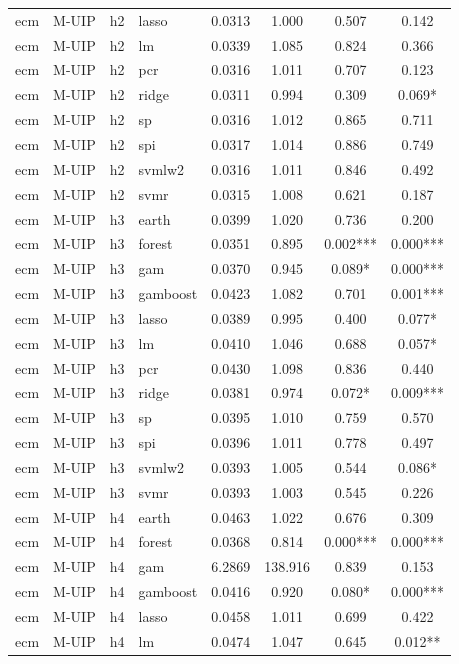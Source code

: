 \begin{ThreePartTable}
\begin{longtable}[t]{llclcccc}
ecm & M-UIP & h2 & lasso & 0.0313 & 1.000 & 0.507 & 0.142\\
ecm & M-UIP & h2 & lm & 0.0339 & 1.085 & 0.824 & 0.366\\
ecm & M-UIP & h2 & pcr & 0.0316 & 1.011 & 0.707 & 0.123\\
ecm & M-UIP & h2 & ridge & 0.0311 & 0.994 & 0.309 & 0.069*\\
ecm & M-UIP & h2 & sp & 0.0316 & 1.012 & 0.865 & 0.711\\
ecm & M-UIP & h2 & spi & 0.0317 & 1.014 & 0.886 & 0.749\\
ecm & M-UIP & h2 & svmlw2 & 0.0316 & 1.011 & 0.846 & 0.492\\
ecm & M-UIP & h2 & svmr & 0.0315 & 1.008 & 0.621 & 0.187\\
\addlinespace
ecm & M-UIP & h3 & earth & 0.0399 & 1.020 & 0.736 & 0.200\\
ecm & M-UIP & h3 & forest & 0.0351 & 0.895 & 0.002*** & 0.000***\\
ecm & M-UIP & h3 & gam & 0.0370 & 0.945 & 0.089* & 0.000***\\
ecm & M-UIP & h3 & gamboost & 0.0423 & 1.082 & 0.701 & 0.001***\\
ecm & M-UIP & h3 & lasso & 0.0389 & 0.995 & 0.400 & 0.077*\\
ecm & M-UIP & h3 & lm & 0.0410 & 1.046 & 0.688 & 0.057*\\
ecm & M-UIP & h3 & pcr & 0.0430 & 1.098 & 0.836 & 0.440\\
ecm & M-UIP & h3 & ridge & 0.0381 & 0.974 & 0.072* & 0.009***\\
ecm & M-UIP & h3 & sp & 0.0395 & 1.010 & 0.759 & 0.570\\
ecm & M-UIP & h3 & spi & 0.0396 & 1.011 & 0.778 & 0.497\\
ecm & M-UIP & h3 & svmlw2 & 0.0393 & 1.005 & 0.544 & 0.086*\\
ecm & M-UIP & h3 & svmr & 0.0393 & 1.003 & 0.545 & 0.226\\
\addlinespace
ecm & M-UIP & h4 & earth & 0.0463 & 1.022 & 0.676 & 0.309\\
ecm & M-UIP & h4 & forest & 0.0368 & 0.814 & 0.000*** & 0.000***\\
ecm & M-UIP & h4 & gam & 6.2869 & 138.916 & 0.839 & 0.153\\
ecm & M-UIP & h4 & gamboost & 0.0416 & 0.920 & 0.080* & 0.000***\\
ecm & M-UIP & h4 & lasso & 0.0458 & 1.011 & 0.699 & 0.422\\
ecm & M-UIP & h4 & lm & 0.0474 & 1.047 & 0.645 & 0.012**\\

\end{longtable}
\end{ThreePartTable}
